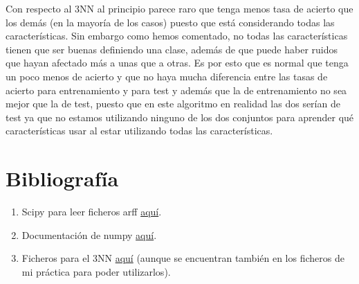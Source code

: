 \documentclass[12pt]{article}
\begin{document}
Con respecto al 3NN al principio parece raro que tenga menos tasa de acierto que los demás (en la mayoría de los casos) puesto que está considerando todas las características. Sin embargo como hemos comentado, no todas las características tienen que ser buenas definiendo una clase, además de que puede haber ruidos que hayan afectado más a unas que a otras. Es por esto que es normal que tenga un poco menos de acierto y que no haya mucha diferencia entre las tasas de acierto para entrenamiento y para test y además que la de entrenamiento no sea mejor que la de test, puesto que en este algoritmo en realidad las dos serían de test ya que no estamos utilizando ninguno de los dos conjuntos para aprender qué características usar al estar utilizando todas las características.

\section{Bibliografía}
\begin{enumerate}
\item Scipy para leer ficheros arff \href{arff http://docs.scipy.org/doc/scipy/reference/generated/scipy.io.arff.loadarff.html}{aquí}.
\item Documentación de numpy \href{http://docs.scipy.org/doc/numpy/user/index.html}{aquí}.
\item Ficheros para el 3NN \href{https://github.com/agarciamontoro/metaheuristics/tree/master/src/knnGPU}{aquí} (aunque se encuentran también en los ficheros de mi práctica para poder utilizarlos).
\end{enumerate}
\end{document}
